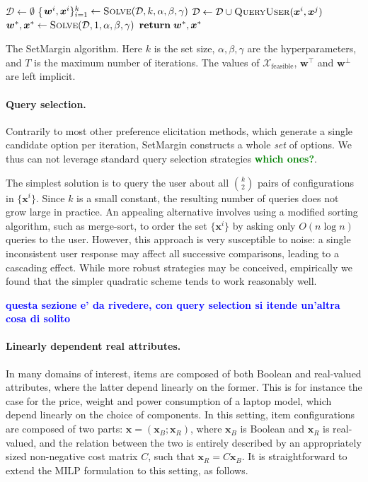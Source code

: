 \documentclass{article}
\renewcommand\[{\begin{equation}}
\renewcommand\]{\end{equation}}
\newcommand{\calvar}[1]{\ensuremath{\mathcal{#1}}}
\newcommand{\calD}{\calvar{D}}
\newcommand{\calX}{\calvar{X}}
\newcommand{\vecvar}[1]{\ensuremath{\boldsymbol{#1}}}
\newcommand{\vw}{\vecvar{w}}
\newcommand{\vx}{\vecvar{x}}
\newcommand{\andrea}[1]{{\bf \textcolor{blue}{{\fbox{Andrea:} #1}}}}
\newcommand{\stefano}[1]{{\bf \textcolor{green}{{\fbox{Stefano:} #1}}}}
\begin{document}
\begin{algorithm}
{\footnotesize
\begin{algorithmic}[1]
        \State $\calD \gets \emptyset$
            \State \{$\vw^{i}, \vx^{i}\}_{i=1}^k \gets \text{{\sc Solve}}(\calD, k, \alpha, \beta, \gamma)$
            \For{$\vx^{i},\vx^{j} \in \{ \vx^{1}, \ldots, \vx^{k} \} \; \text{{\bf s.t.}} \; i < j$}
                \State $\calD \gets \calD \cup \text{{\sc QueryUser}}(\vx^{i},\vx^{j})$
            \EndFor
        \EndFor
        \State $\vw^*, \vx^* \gets \text{{\sc Solve}}(\calD, 1, \alpha, \beta, \gamma)$
        \State ${\bf return}\; \vw^*, \vx^*$
    \EndProcedure
\end{algorithmic}
}
\caption{\label{alg:setmargin} The {\sc SetMargin} algorithm. Here $k$ is the
set size, $\alpha,\beta,\gamma$ are the hyperparameters, and $T$ is the maximum
number of iterations. The values of $\calX_\text{feasible}$, $\vw^\top$ and
$\vw^\bot$ are left implicit.}
\end{algorithm}

\paragraph{Query selection.} Contrarily to most other preference elicitation
methods, which generate a single candidate option per iteration, {\sc
SetMargin} constructs a whole {\em set} of options. We thus can not leverage
standard query selection strategies \stefano{which ones?}. 

The simplest solution is to query the user about all $k \choose 2$ pairs of
configurations in $\{\vx^i\}$. Since $k$ is a small constant, the resulting
number of queries does not grow large in practice.  An appealing alternative
involves using a modified sorting algorithm, such as merge-sort, to order the
set $\{\vx^i\}$ by asking only $O(n\log n)$ queries to the user. However, this
approach is very susceptible to noise: a single inconsistent user response may
affect all successive comparisons, leading to a cascading effect. While more
robust strategies may be conceived, empirically we found that the simpler
quadratic scheme tends to work reasonably well.

\andrea{questa sezione e' da rivedere, con query selection si itende un'altra cosa di solito}

\paragraph{Linearly dependent real attributes.} In many domains of interest,
items are composed of both Boolean and real-valued attributes, where the latter
depend linearly  on the former. This is for instance the case for the price,
weight and power consumption of a laptop model, which depend linearly on the
choice of components.
%
In this setting, item configurations are composed of two parts: $\vx =
(\vx_B;\vx_R)$, where $\vx_B$ is Boolean and $\vx_R$ is real-valued, and the
relation between the two is entirely described by an appropriately sized
non-negative cost matrix $C$, such that $\vx_R = C \vx_B$. It is
straightforward to extend the MILP formulation to this setting, as follows.
\end{document}
